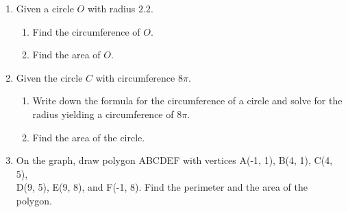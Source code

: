 \documentclass[12pt, oneside]{article}
\begin{document}
\begin{enumerate}
  \item Given a circle $O$ with radius $2.2$.
  \begin{enumerate}
    \item Find the circumference of $O$. \vspace{2cm}
    \item Find the area of $O$.
  \end{enumerate}

\newpage

  \item Given the circle $C$ with circumference $8\pi$.
  \begin{enumerate}
    \item Write down the formula for the circumference of a circle and solve for the radius yielding a circumference of $8\pi$. \vspace{1cm}
    \item Find the area of the circle.
  \end{enumerate}

  \item On the graph, draw polygon ABCDEF with vertices A(-1, 1), B(4, 1),
  C(4, 5), \\ D(9, 5), E(9, 8), and F(-1, 8). Find the perimeter and the area of the polygon.\\[1cm]
  \vspace{2cm}



  \end{enumerate}
\end{document}
